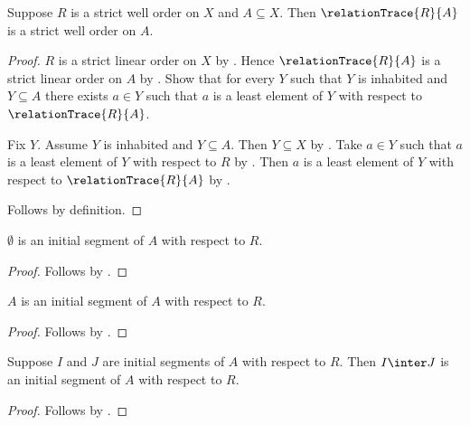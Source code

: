 \begin{proposition}\label{relation_trace_strict_well_order}
    Suppose $R$ is a strict well order on $X$ and $A\subseteq X$.
    Then $\relationTrace{R}{A}$ is a strict well order on $A$.
\end{proposition}
\begin{proof}
    $R$ is a strict linear order on $X$ by .
    Hence $\relationTrace{R}{A}$ is a strict linear order on $A$ by
        .
    Show that for every $Y$ such that $Y$ is inhabited and $Y\subseteq A$
        there exists $a\in Y$ such that
            $a$ is a least element of $Y$ with respect to
                $\relationTrace{R}{A}$.
    \begin{subproof}
        Fix $Y$.
        Assume $Y$ is inhabited and $Y\subseteq A$.
        Then $Y\subseteq X$ by .
        Take $a\in Y$ such that
            $a$ is a least element of $Y$ with respect to $R$ by
            .
        Then $a$ is a least element of $Y$ with respect to
            $\relationTrace{R}{A}$ by
            .
    \end{subproof}
    Follows by definition.
\end{proof}

\begin{proposition}\label{emptyset_initial_segment}
    $\emptyset$ is an initial segment of $A$ with respect to $R$.
\end{proposition}
\begin{proof}
    Follows by .
\end{proof}

\begin{proposition}\label{carrier_initial_segment}
    $A$ is an initial segment of $A$ with respect to $R$.
\end{proposition}
\begin{proof}
    Follows by .
\end{proof}

\begin{proposition}\label{inter_initial_segments}
    Suppose $I$ and $J$ are initial segments of $A$ with respect to $R$.
    Then $I\inter J$ is an initial segment of $A$ with respect to $R$.
\end{proposition}
\begin{proof}
    Follows by .
\end{proof}

